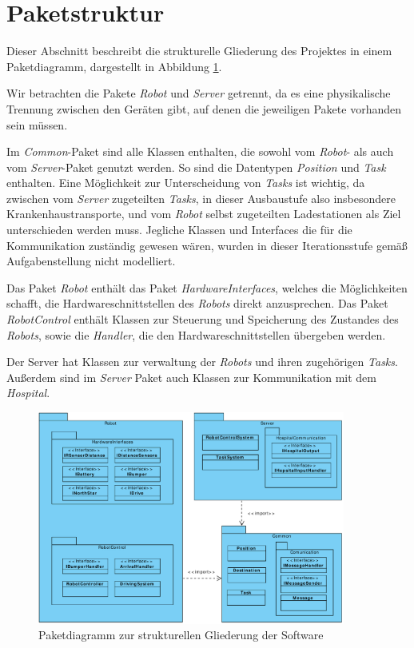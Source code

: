 \section{Paketstruktur}
Dieser Abschnitt beschreibt die strukturelle Gliederung des Projektes in einem Paketdiagramm, dargestellt in Abbildung \ref{Paketstruktur}.

Wir betrachten die Pakete \textit{Robot} und \textit{Server} getrennt, da es eine physikalische Trennung zwischen den Geräten gibt, auf denen die jeweiligen Pakete vorhanden sein müssen.

Im \textit{Common}-Paket sind alle Klassen enthalten, die sowohl vom \textit{Robot}- als auch vom \textit{Server}-Paket genutzt werden. So sind die Datentypen \textit{Position} und \textit{Task} enthalten. Eine Möglichkeit zur Unterscheidung von \textit{Tasks} ist wichtig, da zwischen vom \textit{Server} zugeteilten \textit{Tasks}, in dieser Ausbaustufe also insbesondere Krankenhaustransporte, und vom \textit{Robot} selbst zugeteilten Ladestationen als Ziel unterschieden werden muss. Jegliche Klassen und Interfaces die für die Kommunikation zuständig gewesen wären, wurden in dieser Iterationsstufe gemäß Aufgabenstellung nicht modelliert.

Das Paket \textit{Robot} enthält das Paket \textit{HardwareInterfaces}, welches die Möglichkeiten schafft, die Hardwareschnittstellen des \textit{Robots} direkt anzusprechen. Das Paket \textit{RobotControl} enthält Klassen zur Steuerung und Speicherung des Zustandes des \textit{Robots}, sowie die \emph{Handler}, die den Hardwareschnittstellen übergeben werden.

Der Server hat Klassen zur verwaltung der \textit{Robots} und ihren zugehörigen \textit{Tasks}. Außerdem sind im \textit{Server} Paket auch Klassen zur Kommunikation mit dem \textit{Hospital}.

\begin{figure}[H]
\centering
\includegraphics[width=0.9\textwidth]{img/6_paketdiagramm}
\caption{Paketdiagramm zur strukturellen Gliederung der Software}
\label{Paketstruktur}
\end{figure}
